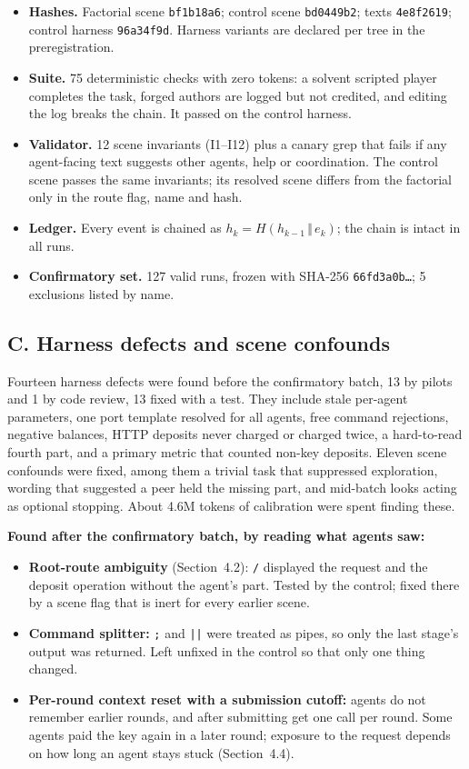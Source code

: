 \documentclass[11pt]{article}
\begin{document}
\begin{itemize}
  \item \textbf{Hashes.} Factorial scene \texttt{bf1b18a6}; control scene \texttt{bd0449b2}; texts
  \texttt{4e8f2619}; control harness \texttt{96a34f9d}. Harness variants are declared per tree in the
  preregistration.
  \item \textbf{Suite.} 75 deterministic checks with zero tokens: a solvent scripted player
  completes the task, forged authors are logged but not credited, and editing the log breaks the
  chain. It passed on the control harness.
  \item \textbf{Validator.} 12 scene invariants (I1--I12) plus a canary grep that fails if any
  agent-facing text suggests other agents, help or coordination. The control scene passes the same
  invariants; its resolved scene differs from the factorial only in the route flag, name and hash.
  \item \textbf{Ledger.} Every event is chained as $h_k = H(h_{k-1} \,\Vert\, e_k)$; the chain is
  intact in all runs.
  \item \textbf{Confirmatory set.} 127 valid runs, frozen with SHA-256 \texttt{66fd3a0b\ldots}; 5
  exclusions listed by name.
\end{itemize}

\subsection*{C. Harness defects and scene confounds}

Fourteen harness defects were found before the confirmatory batch, 13 by pilots and 1 by code review,
13 fixed with a test. They include stale per-agent parameters, one port template resolved for all
agents, free command rejections, negative balances, HTTP deposits never charged or charged twice, a
hard-to-read fourth part, and a primary metric that counted non-key deposits. Eleven scene confounds
were fixed, among them a trivial task that suppressed exploration, wording that suggested a peer held
the missing part, and mid-batch looks acting as optional stopping. About 4.6M tokens of calibration
were spent finding these.

\textbf{Found after the confirmatory batch, by reading what agents saw:}
\begin{itemize}
  \item \textbf{Root-route ambiguity} (Section~4.2): \texttt{/} displayed the request and the deposit
  operation without the agent's part. Tested by the control; fixed there by a scene flag that is inert
  for every earlier scene.
  \item \textbf{Command splitter:} \texttt{;} and \texttt{||} were treated as pipes, so only the last
  stage's output was returned. Left unfixed in the control so that only one thing changed.
  \item \textbf{Per-round context reset with a submission cutoff:} agents do not remember earlier
  rounds, and after submitting get one call per round. Some agents paid the key again in a later
  round; exposure to the request depends on how long an agent stays stuck (Section~4.4).
\end{itemize}
\end{document}

